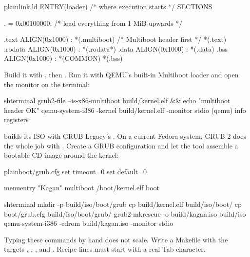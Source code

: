 \documentclass[11pt,a4paper]{article}
\begin{document}
\begin{lst}{plain}{link.ld}
ENTRY(loader)                   /* where execution starts */
SECTIONS
{
    . = 0x00100000;             /* load everything from 1 MiB upwards */

    .text ALIGN(0x1000) : {
        *(.multiboot)           /* Multiboot header first */
        *(.text)
    }
    .rodata ALIGN(0x1000) : { *(.rodata*) }
    .data   ALIGN(0x1000) : { *(.data) }
    .bss    ALIGN(0x1000) : { *(COMMON) *(.bss) }
}
\end{lst}

Build it with , then
. Run it with QEMU's built-in Multiboot loader and
open the monitor on the terminal:

\begin{lst}{sh}{terminal}
grub2-file --is-x86-multiboot build/kernel.elf && echo "multiboot header OK"
qemu-system-i386 -kernel build/kernel.elf -monitor stdio
(qemu) info registers
\end{lst}

\LOB builds its ISO with GRUB Legacy's . On a current Fedora system, GRUB 2 does the whole job
with . Create a GRUB configuration and let the tool assemble a bootable CD image around the
kernel:

\begin{lst}{plain}{boot/grub.cfg}
set timeout=0
set default=0

menuentry "Kagan" {
    multiboot /boot/kernel.elf
    boot
}
\end{lst}

\begin{lst}{sh}{terminal}
mkdir -p build/iso/boot/grub
cp build/kernel.elf build/iso/boot/
cp boot/grub.cfg build/iso/boot/grub/
grub2-mkrescue -o build/kagan.iso build/iso
qemu-system-i386 -cdrom build/kagan.iso -monitor stdio
\end{lst}

Typing these commands by hand does not scale. Write a Makefile with the targets , , ,
 and . Recipe lines must start with a real Tab character.
\end{document}
